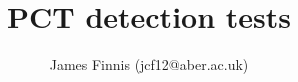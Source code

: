 \documentclass{article}
\title{PCT detection tests}
\author{James Finnis (jcf12@aber.ac.uk)}
\begin{document}
\onehalfspacing
\raggedbottom

\maketitle



\printbibliography
\end{document}

